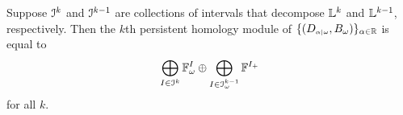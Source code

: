 %

\begin{lemma}\label{lem:decomposition}
  Suppose $\mathcal{I}^k$ and $\mathcal{I}^{k-1}$ are collections of intervals that decompose $\mathbb{L}^k$ and $\mathbb{L}^{k-1}$, respectively.
  Then the $k$th persistent homology module of $\{(D_{\scriptscriptstyle \alpha\mid \omega}, B_\omega)\}_{\alpha\in\mathbb{R}}$ is equal to
  \[\bigoplus_{I\in\mathcal{I}^k} \mathbb{F}_\omega^I \oplus \bigoplus_{I\in \mathcal{I}_\omega^{k-1}} \mathbb{F}^{I_+}\]
  for all $k$.
\end{lemma}

